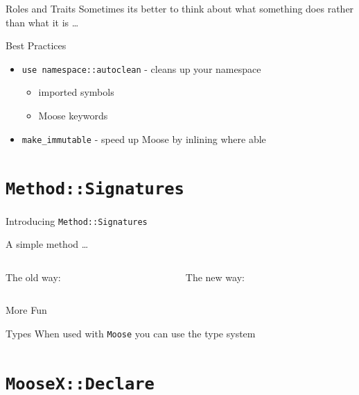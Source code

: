 \documentclass[mathserif]{beamer}
\providecommand{\code}[1]{{\texttt{\scriptsize{#1}}}}
\providecommand{\inputcode}[1]{
  \begin{block}{}
    \scriptsize{}
  \end{block}
}
\begin{document}
\begin{frame}{Roles and Traits}
  Sometimes its better to think about what something does rather than what it is \ldots
  \inputcode{moose/role}
\end{frame}

\begin{frame}{Best Practices}
  \begin{itemize}
    \item \code{use namespace::autoclean} - cleans up your namespace
    \begin{itemize}
      \item imported symbols
      \item Moose keywords
    \end{itemize}
    \item \code{make\_immutable} - speed up Moose by inlining where able
  \end{itemize}
  \inputcode{moose/best-practices}
\end{frame}

\section{\code{Method::Signatures}}

\begin{frame}{Introducing \texttt{Method::Signatures}}

A simple method \ldots

\vfill

\begin{columns}
  \begin{column}{0.49\linewidth}
    The old way:
    \inputcode{signatures/old}
  \end{column}
  \begin{column}{0.49\linewidth}
    The new way:
    \inputcode{signatures/new}
  \end{column}
\end{columns}
\end{frame}

\begin{frame}{More Fun}
  \inputcode{signatures/more}
\end{frame}

\begin{frame}{Types}
  When used with \code{Moose} you can use the type system
  \inputcode{signatures/types}
\end{frame}

\section{\code{MooseX::Declare}}
\end{document}
